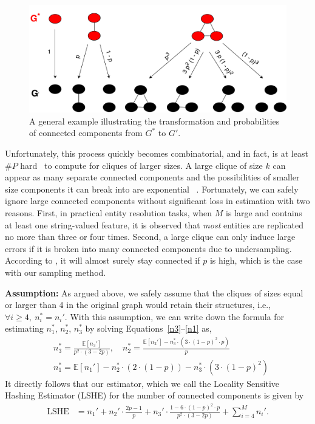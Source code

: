 \documentclass[aoas]{imsart}
\begin{document}
\begin{figure}[ht]
	\begin{center}
		\includegraphics[width=\linewidth]{fig/p.pdf}
		\caption{A general example illustrating the transformation and probabilities of connected components from $G^*$ to $G'.$}
		\label{p}
	\end{center}
	\vskip -0.2in
\end{figure}

Unfortunately, this process quickly becomes combinatorial, and in fact, is at least $\#P$ hard~\citep{doi:10.1137/0212053} to compute for cliques of larger sizes. A large clique of size $k$ can appear as many separate connected components and the possibilities of smaller size components it can break into are exponential ~\citep{wiki:xxx}.
%
Fortunately, we can safely ignore large connected components without significant loss in estimation with two reasons.
First, in practical entity resolution tasks, when $M$ is large and contains at least one string-valued feature, it is observed that \emph{most} entities are replicated no more than three or four times. Second,  a large clique can only induce large errors if it is broken into many connected components due to undersampling. According to \cite{erdos1960evolution}, it will almost surely stay connected if $p$ is high, which is the case with our sampling method.

{\bf Assumption:} As argued above, we safely assume that the cliques of sizes equal or larger than 4 in the original graph would retain their structures, i.e., $\forall i \ge 4, \ n_i^* = n_i'$. With this assumption, we can write down the formula for estimating $n_1^*$, $n_2^*$, $n_3^*$ by solving Equations~\ref{n3}--\ref{n1} as,
\begin{align}
&n_3^*= \frac{\mathbb{E}[n_3']}{p^2 \cdot (3-2p) }, \quad n_2^* = \frac{\mathbb{E}[n_2'] - n_3^*\cdot (3\cdot(1-p)^2\cdot p)}{p}  \\
&n_1^* = \mathbb{E}[n_1'] - n_2^* \cdot(2\cdot(1-p)) - n_3^* \cdot (3\cdot (1-p)^2)
\end{align}
It directly follows that our estimator, which we call the Locality Sensitive Hashing Estimator (LSHE) for the number of connected components is given by
\begin{align}
\label{main}
\text{LSHE} &= n_1' +  n_2' \cdot \frac{2p-1}{p}  + n_3' \cdot \frac{1-6 \cdot (1-p)^2 \cdot p}{p^2 \cdot (3-2p) }
+ \sum_{i=4}^{M}n_i'.
\end{align}
\end{document}
